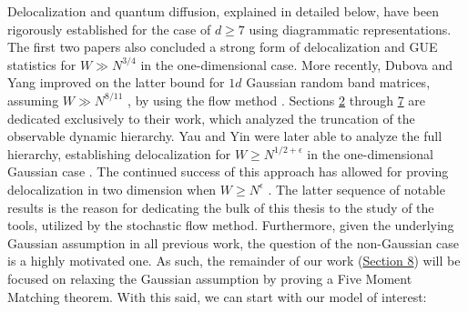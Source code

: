 \documentclass[11pt]{article}
\begin{document}
\noindent Delocalization and quantum diffusion, explained in detailed below, have been rigorously established for the case of $d\geq 7$ \cite{8, 9, 40, highdim} using diagrammatic representations. The first two papers also 
concluded a strong form of delocalization and GUE statistics for  $W\gg N^{3/4}$ \cite{8, 9} in the one-dimensional case. More recently, Dubova and Yang improved on the latter bound for $1d$ Gaussian random band matrices, assuming $W\gg N^{8/11}$ \cite{bandSDE}, by using the flow method \cite{RP, soosten}. Sections \hyperref[sec:flow]{2} through \hyperref[sec:drift]{7} are dedicated exclusively to their work, which analyzed the truncation of the observable dynamic hierarchy. Yau and Yin were later able to analyze the full hierarchy, establishing delocalization for $W\geq N^{{1/2}+\epsilon}$ in the one-dimensional Gaussian case \cite{yauyin}. The continued success of this approach has allowed for proving delocalization in two dimension when $W\geq N^\epsilon$ \cite{twodim}. The latter sequence of notable results is the reason for dedicating the bulk of this thesis to the study of the tools, utilized by the stochastic flow method. Furthermore, given the underlying Gaussian assumption in all previous work, the question of the non-Gaussian case is a highly motivated one. As such, the remainder of our work (\hyperref[sec:non-gaussian]{Section 8}) will be focused on relaxing the Gaussian assumption by proving a Five Moment Matching theorem. With this said, we can start with our model of interest:

\newpage
\end{document}
